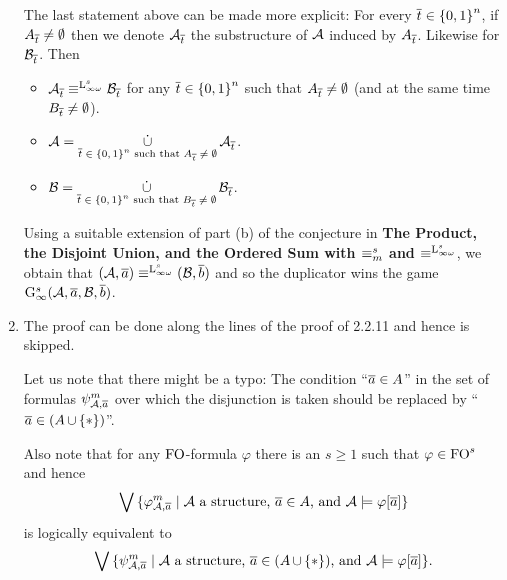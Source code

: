 \begin{enumerate}[1.]
\begin{remark}
The last statement above can be made more explicit: For every $\overline{t} \in {\{0, 1\}}^{n}$, if $A_{\overline{t}} \neq \emptyset$ then we denote $\mathcal{A}_{\overline{t}}$ the substructure of $\mathcal{A}$ induced by $A_{\overline{t}}$. Likewise for $\mathcal{B}_{\overline{t}}$. Then
\begin{itemize}
\item $\strct{A}_{\vect{t}} \equv^{\inflog[s]} \strct{B}_{\vect{t}}$ for any $\overline{t} \in {\{0, 1\}}^{n}$ such that $A_{\overline{t}} \neq \emptyset$ (and at the same time $B_{\overline{t}} \neq \emptyset$).
\item $\ds{\strct{A} = \dunion_{\mbox{\scriptsize\mathmode{\vect{t} \in \cartpwr{\sete{0, 1}}{n}} such that \mathmode{A_{\vect{t}} \neq \emptyset}}} \strct{A}_{\vect{t}}}$.
\item $\ds{\strct{B} = \dunion_{\mbox{\scriptsize\mathmode{\vect{t} \in \cartpwr{\sete{0, 1}}{n}} such that \mathmode{B_{\vect{t}} \neq \emptyset}}} \strct{B}_{\vect{t}}}$.
\end{itemize}
Using a suitable extension of part (b) of the conjecture in \textbf{The Product, the Disjoint Union, and the Ordered Sum with $\equiv^s_m$ and $\equv^{\inflog[s]}$}, we obtain that $(\strct{A}, \vect{a}) \equv^{\inflog[s]} (\strct{B}, \vect{b})$ and so the duplicator wins the game $\game[s]{\infty}(\strct{A}, \vect{a}, \strct{B}, \vect{b})$.
\end{remark}
%
\item {} The proof can be done along the lines of the proof of 2.2.11 and hence is skipped.

Let us note that there might be a typo: The condition ``$\overline{a} \in A$'' in the set of formulas $\ityp{m}{\strct{A}, \vect{a}}$ over which the disjunction is taken should be replaced by ``$\overline{a} \in (A \mathop{\cup} {\{\ast\}})$''.

Also note that for any $\folog$-formula $\varphi$ there is an $s \geq 1$ such that $\varphi \in \folog^s$ and hence
\[
\blor \sett{\hint{m}{\strct{A}, \vect{a}}}{\mathmode{\strct{A}} a structure, \mathmode{\vect{a} \in A}, and \mathmode{\strct{A} \satis \varphi[\vect{a}]}}
\]
is logically equivalent to
\[
\blor \sett{\ityp{m}{\strct{A}, \vect{a}}}{\mathmode{\strct{A}} a structure, \mathmode{\vect{a} \in (A \union \sete{\off})}, and \mathmode{\strct{A} \satis \varphi[\vect{a}]}}.
\]
%
\end{enumerate}
